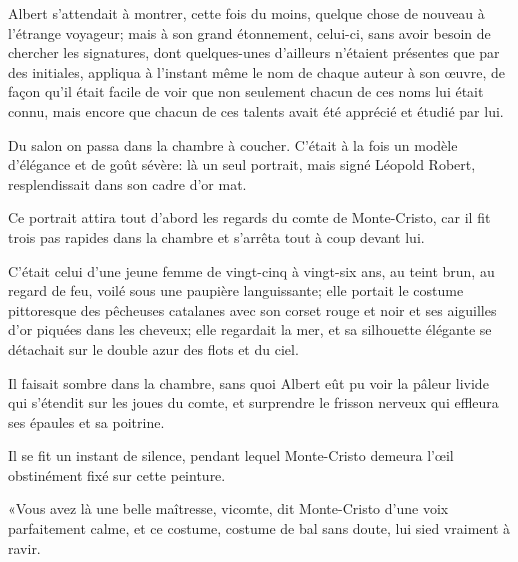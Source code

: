 Albert s'attendait à montrer, cette fois du moins, quelque chose de nouveau à l'étrange voyageur; mais à son grand étonnement, celui-ci, sans avoir besoin de chercher les signatures, dont quelques-unes d'ailleurs n'étaient présentes que par des initiales, appliqua à l'instant même le nom de chaque auteur à son œuvre, de façon qu'il était facile de voir que non seulement chacun de ces noms lui était connu, mais encore que chacun de ces talents avait été apprécié et étudié par lui. 

Du salon on passa dans la chambre à coucher. C'était à la fois un modèle d'élégance et de goût sévère: là un seul portrait, mais signé Léopold Robert, resplendissait dans son cadre d'or mat. 

Ce portrait attira tout d'abord les regards du comte de Monte-Cristo, car il fit trois pas rapides dans la chambre et s'arrêta tout à coup devant lui. 

C'était celui d'une jeune femme de vingt-cinq à vingt-six ans, au teint brun, au regard de feu, voilé sous une paupière languissante; elle portait le costume pittoresque des pêcheuses catalanes avec son corset rouge et noir et ses aiguilles d'or piquées dans les cheveux; elle regardait la mer, et sa silhouette élégante se détachait sur le double azur des flots et du ciel. 

Il faisait sombre dans la chambre, sans quoi Albert eût pu voir la pâleur livide qui s'étendit sur les joues du comte, et surprendre le frisson nerveux qui effleura ses épaules et sa poitrine. 

Il se fit un instant de silence, pendant lequel Monte-Cristo demeura l'œil obstinément fixé sur cette peinture. 

«Vous avez là une belle maîtresse, vicomte, dit Monte-Cristo d'une voix parfaitement calme, et ce costume, costume de bal sans doute, lui sied vraiment à ravir. 


